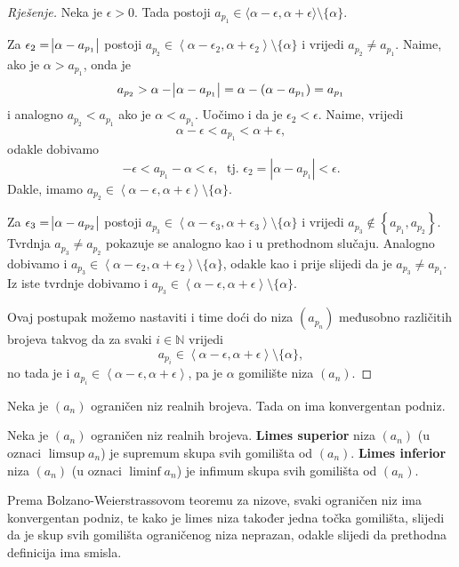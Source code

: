 \begin{proof}[Rješenje]
Neka je $\epsilon>0$. Tada postoji $a_{p_1}\in \langle \alpha-\epsilon, \alpha+\epsilon\rangle\setminus \{\alpha\}$. 

Za $\epsilon_2=\abs{\alpha-a_{p_1}}$ postoji $a_{p_2}\in \left\langle \alpha-\epsilon_2, \alpha+\epsilon_2\right\rangle\setminus \{\alpha\}$ i vrijedi $a_{p_2}\neq a_{p_1}$. Naime, ako je $\alpha>a_{p_1}$, onda je $$a_{p_2}>\alpha-\abs{\alpha-a_{p_1}}=\alpha-(\alpha-a_{p_1})=a_{p_1}$$
i analogno $a_{p_2}<a_{p_1}$ ako je $\alpha< a_{p_1}$.
Uočimo i da je $\epsilon_2<\epsilon$. Naime, vrijedi
$$\alpha-\epsilon<a_{p_1}<\alpha+\epsilon,$$
odakle dobivamo
$$-\epsilon<a_{p_1}-\alpha<\epsilon,\;\text{ tj. } \epsilon_2=|\alpha-a_{p_1}|<\epsilon.$$
Dakle, imamo $a_{p_2}\in \left\langle \alpha-\epsilon, \alpha+\epsilon\right\rangle\setminus \{\alpha\}$.

Za $\epsilon_3=\abs{\alpha-a_{p_2}}$ postoji $a_{p_3}\in \left\langle \alpha-\epsilon_3, \alpha+\epsilon_3\right\rangle\setminus \{\alpha\}$ i vrijedi $a_{p_3}\notin \left\{a_{p_1},a_{p_2}\right\}$. Tvrdnja $a_{p_3}\neq a_{p_2}$ pokazuje se analogno kao i u prethodnom slučaju. Analogno dobivamo i $a_{p_3}\in \left\langle \alpha-\epsilon_2, \alpha+\epsilon_2\right\rangle\setminus \{\alpha\}$, odakle kao i prije slijedi da je $a_{p_3}\neq a_{p_1}$. Iz iste tvrdnje dobivamo i $a_{p_3}\in \left\langle \alpha-\epsilon, \alpha+\epsilon\right\rangle\setminus \{\alpha\}$.

Ovaj postupak možemo nastaviti i time doći do niza $(a_{p_n})$ međusobno različitih brojeva takvog da za svaki $i\in \mathbb{N}$ vrijedi 
$$a_{p_i}\in\left\langle \alpha-\epsilon, \alpha+\epsilon\right\rangle\setminus\{\alpha\},$$
no tada je i $a_{p_i}\in\left\langle \alpha-\epsilon, \alpha+\epsilon\right\rangle$, pa je $\alpha$ gomilište niza $(a_n)$.
\end{proof}  
\begin{remark}
Neka je $(a_n)$ ograničen niz realnih brojeva. Tada on ima konvergentan podniz.
\end{remark}
\begin{definition}
Neka je $(a_n)$ ograničen niz realnih brojeva. \textbf{Limes superior} niza $(a_n)$ (u oznaci $\limsup{a_n}$) je supremum skupa svih gomilišta od $(a_n)$. \textbf{Limes inferior} niza $(a_n)$ (u oznaci $\liminf{a_n}$) je infimum skupa svih gomilišta od $(a_n)$. 
\end{definition}

Prema Bolzano-Weierstrassovom teoremu za nizove, svaki ograničen niz ima konvergentan podniz, te kako je limes niza također jedna točka gomilišta, slijedi da je skup svih gomilišta ograničenog niza neprazan, odakle slijedi da prethodna definicija ima smisla.


